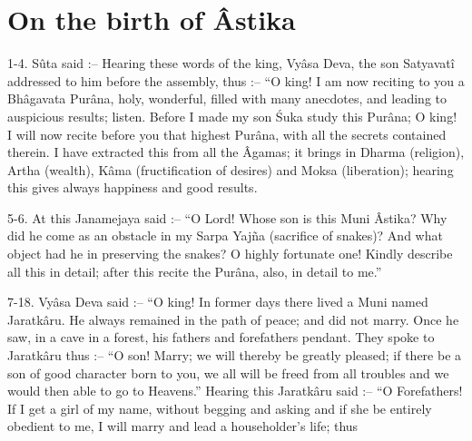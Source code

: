 ﻿\chapter{On the birth of \^Astika}

1-4. S\^uta said :-- Hearing these words of the king, Vy\^asa Deva, the son Satyavat\^i addressed to him before the assembly, thus :-- ``O king! I am now reciting to you a Bh\^agavata Pur\^ana, holy, wonderful, filled with many anecdotes, and leading to auspicious results; listen. Before I made my son \'Suka study this Pur\^ana; O king! I will now recite before you that highest Pur\^ana, with all the secrets contained therein. I have extracted this from all the \^Agamas; it brings in Dharma (religion), Artha (wealth), K\^ama (fructification of desires) and Moksa (liberation); hearing this gives always happiness and good results.

5-6. At this Janamejaya said :-- ``O Lord! Whose son is this Muni \^Astika? Why did he come as an obstacle in my Sarpa Yaj\~na (sacrifice of snakes)? And what object had he in preserving the snakes? O highly fortunate one! Kindly describe all this in detail; after this recite the Pur\^ana, also, in detail to me.''

7-18. Vy\^asa Deva said :-- ``O king! In former days there lived a Muni named Jaratk\^aru. He always remained in the path of peace; and did not marry. Once he saw, in a cave in a forest, his fathers and forefathers pendant. They spoke to Jaratk\^aru thus :-- ``O son! Marry; we will thereby be greatly pleased; if there be a son of good character born to you, we all will be freed from all troubles and we would then able to go to Heavens.'' Hearing this Jaratk\^aru said :-- ``O Forefathers! If I get a girl of my name, without begging and asking and if she be entirely obedient to me, I will marry and lead a householder's life; thus

